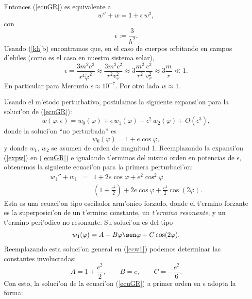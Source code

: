 Entonces (\ref{ecuGR})  es equivalente a
\begin{equation}
w''+w=1+\epsilon\,w^2 ,\label{ecwGR}
\end{equation}
con
\begin{equation}
 \epsilon:=\frac{3}{h^2}.
\end{equation}
Usando (\ref{kh}b) encontramos que, en el caso de cuerpos orbitando en campos
d'ebiles (como es el caso en nuestro sistema solar),
\begin{equation}
 \epsilon=\frac{3m^2c^2}{r^4\dot\varphi^2}\approx\frac{3m^2c^2}{r^2v_\varphi^2}
 \approx 3\frac{m^2}{r^2}\frac{c^2}{v_\varphi^2}\approx 3\frac{m}{r}\ll 1.
\end{equation}
En particular para Mercurio $\epsilon\approx 10^{-7}$. Por otro lado $w\approx
1$.

Usando el m'etodo perturbativo, postulamos la siguiente expansi'on para la soluci'on de (\ref{ecuGR}):
\begin{equation}
w(\varphi,\epsilon)=w_0(\varphi)+\epsilon\, w_1(\varphi) +\epsilon^2\,w_2(\varphi)+O(\epsilon^3), \label{expw}
\end{equation}
donde la soluci'on ``no perturbada'' es
\begin{equation}
 w_0(\varphi)=1+e\cos\varphi ,
\end{equation}
y donde $w_1$, $w_2$ se asumen de orden de magnitud 1. Reemplazando la expansi'on (\ref{expw}) en (\ref{ecuGR}) e igualando t'erminos del mismo orden en potencias de $\epsilon$, obtenemos la siguiente ecuaci'on para la primera perturbaci'on:
\begin{eqnarray}
 w_1''+w_1&=&1+2e\cos\varphi+e^2\cos^2\varphi \\
&=& (1+\frac{e^2}{2})+2e\cos\varphi+\frac{e^2}{2}\cos(2\varphi). \label{ecw1}
\end{eqnarray}
Esta es una ecuaci'on tipo oscilador arm'onico forzado, donde el t'ermino forzante es la superposici'on de un t'ermino constante, un \textit{t'ermino resonante}, y un t'ermino peri'odico no resonante. Su soluci'on es del tipo
\begin{equation}
 w_1(\varphi)=A+B\varphi\sen\varphi+C\cos(2\varphi).
\end{equation}
Reemplazando esta soluci'on general en (\ref{ecw1}) podemos determinar las constantes involucradas:
\begin{equation}
 A=1+\frac{e^2}{2}, \qquad B=e, \qquad C=-\frac{e^2}{6}.
\end{equation}
Con esto, la soluci'on de la ecuaci'on (\ref{ecuGR}) a primer orden en $\epsilon$ adopta la forma:
